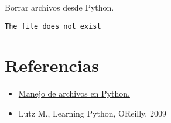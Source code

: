 \begin{code} Borrar archivos desde Python.
\begin{Shaded}
\begin{Highlighting}[]
\NormalTok{)}
\end{Highlighting}
\end{Shaded}

\begin{Shaded}
\begin{Highlighting}[]
\NormalTok{):}
\NormalTok{)}
\NormalTok{:}
  \NormalTok{(}\NormalTok{)}
\end{Highlighting}
\end{Shaded}

\begin{verbatim}
The file does not exist
\end{verbatim}
\end{code}

\section{Referencias}

\begin{itemize}
  \item \href{https://www.w3schools.com/python/python_file_handling.asp}{Manejo de archivos en Python.}
  \item Lutz M., Learning Python, O\textquotesingle Reilly. 2009
\end{itemize}
